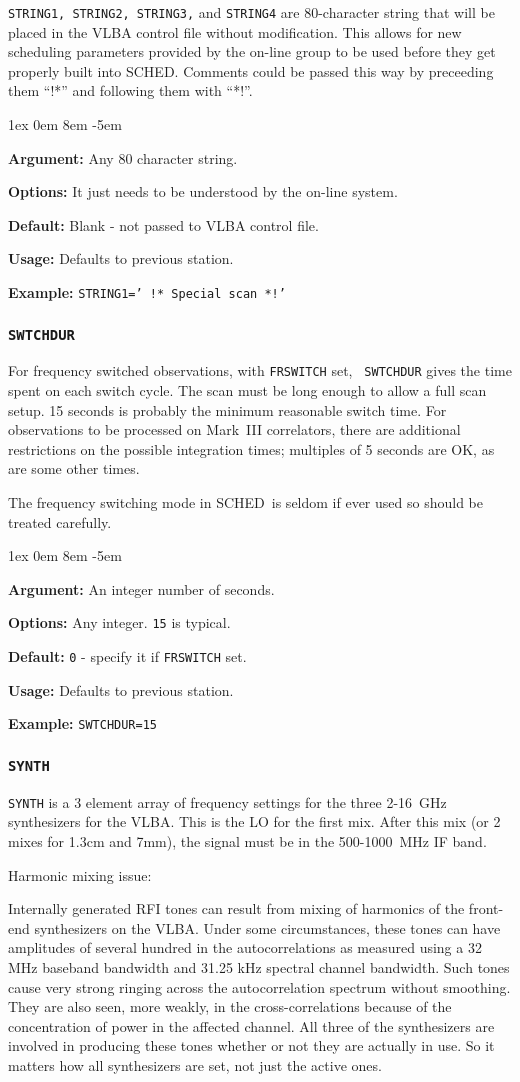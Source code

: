 \documentclass{report}
\newcommand{\schedb}{{\sc SCHED~}}
\newcommand{\rcwbox}[5]{
  \begin{list}{}{\parsep 1ex  \itemsep 0em
                 \leftmargin 8em  \itemindent -5em }
    \item {\bf Argument:} #1
    \item {\bf Options:}  #2
    \item {\bf Default:}  #3
    \item {\bf Usage:}    #4
    \item {\bf Example:}  #5
  \end{list}
}
\begin{document}
{\tt STRING1, STRING2, STRING3,} and {\tt STRING4} are 80-character
string that will be placed in the VLBA control file without
modification. This allows for new scheduling parameters provided by
the on-line group to be used before they get properly built into {\sc
SCHED}. Comments could be passed this way by preceeding them ``!*''
and following them with ``*!''.

\rcwbox
{Any 80 character string.}
{It just needs to be understood by the on-line system.}
{Blank - not passed to VLBA control file.}
{Defaults to previous station.}
{{\tt STRING1=' !*  Special scan  *!'}}


\subsubsection{\label{SP:SWTCHDUR}{\tt SWTCHDUR}}

For frequency switched observations, with {\tt FRSWITCH} set, {\tt
SWTCHDUR} gives the time spent on each switch cycle.  The scan must be
long enough to allow a full scan setup.  15 seconds is probably the
minimum reasonable switch time.  For observations to be processed on
Mark~III correlators, there are additional restrictions on the
possible integration times; multiples of 5 seconds are OK, as are some
other times.

The frequency switching mode in \schedb is seldom if ever used so
should be treated carefully.

\rcwbox
{An integer number of seconds.}
{Any integer. {\tt 15} is typical.}
{{\tt 0} - specify it if {\tt FRSWITCH} set.}
{Defaults to previous station.}
{{\tt SWTCHDUR=15}}


\subsubsection{\label{SP:SYNTH}{\tt SYNTH}}

{\tt SYNTH} is a 3 element array of frequency settings for the three
2-16~GHz synthesizers for the VLBA. This is the LO for the first
mix. After this mix (or 2 mixes for 1.3cm and 7mm), the signal must be
in the 500-1000~MHz IF band.

Harmonic mixing issue:

Internally generated RFI tones can result from mixing of harmonics of
the front-end synthesizers on the VLBA.  Under some circumstances,
these tones can have amplitudes of several hundred in the
autocorrelations as measured using a 32 MHz baseband bandwidth and
31.25 kHz spectral channel bandwidth.  Such tones cause very strong
ringing across the autocorrelation spectrum without smoothing.  They
are also seen, more weakly, in the cross-correlations because of the
concentration of power in the affected channel.  All three of the
synthesizers are involved in producing these tones whether or not they
are actually in use.  So it matters how all synthesizers are set, not
just the active ones.
\end{document}
